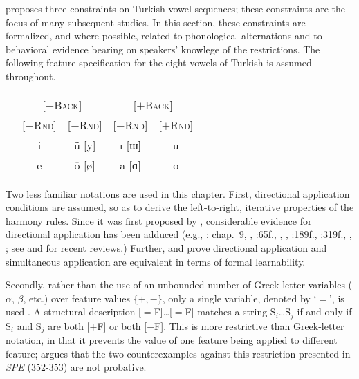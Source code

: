 \citet{Lees1966b,Lees1966a} proposes three constraints on Turkish vowel sequences; these constraints are the focus of many subsequent studies. In this section, these constraints are formalized, and where possible, related to phonological alternations and to behavioral evidence bearing on speakers' knowlege of the restrictions. The following feature specification for the eight vowels of Turkish is assumed throughout.

\begin{example}
\begin{tabular}{c c c c c}
                       & \multicolumn{2}{c}{[$-$\textsc{Back}]} & \multicolumn{2}{c}{[$+$\textsc{Back}]} \\
                       & [$-$\textsc{Rnd}] & [$+$\textsc{Rnd}] & [$-$\textsc{Rnd}] & [$+$\textsc{Rnd}] \\ 
\cmidrule{2-5}
 & {i} & {ü} [y] & {ı} [ɯ] & {u} \\
 & {e} & {ö} [ø] & {a} [ɑ] & {o} \\
\end{tabular}
\end{example}

Two less familiar notations are used in this chapter. First, directional application conditions are assumed, so as to derive the left-to-right, iterative properties of the harmony rules. Since it was first proposed by \citet{Johnson1972}, considerable evidence for directional application has been adduced (e.g., \citealt{A74}: chap.~9, \citealt{GormanInPressc}, \citealt{Howard1972}:65f., \citealt{Kavitskaya2008}, \citealt{Kaye1982}, \citealt{KK77}:189f., \citeyear{KK79}:319f., \citealt{Piggott1975}, \citealt{Sohn1971}; see \citealt{McCarthy2003b} and \citealt{Wolf2011b} for recent reviews.) Further, \citet{Johnson1972} and \citet{Kaplan1994} prove directional application and simultaneous application are equivalent in terms of formal learnability.

Secondly, rather than the use of an unbounded number of Greek-letter variables ($\alpha$, $\beta$, etc.) over feature values $\{+, -\}$, only a single variable, denoted by `$=$', is used \citep{McCawley1973}. A structural description [$=$F]\ldots{}[$=$F] matches a string S$_i$\ldots{}S$_j$ if and only if S$_i$ and S$_j$ are both [$+$F] or both [$-$F]. This is more restrictive than Greek-letter notation, in that it prevents the value of one feature being applied to different feature; \citet{Odden2012} argues that the two counterexamples against this restriction presented in \emph{SPE} (352-353) are not probative.

